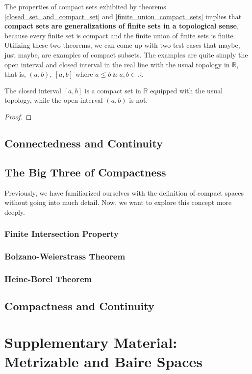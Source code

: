\noindent The properties of compact sets exhibited by theorems \eqref{closed_set_and_compact_set} and \eqref{finite_union_compact_sets} implies that \textbf{compact sets are generalizations of finite sets in a topological sense}, because every finite set is compact\footnotemark {} and the finite union of finite sets is finite.\\ Utilizing these two theorems, we can come up with two test cases that maybe, just maybe, are examples of compact subsets. The examples are quite simply the open interval and closed interval in the real line with the usual topology in $\mathbb{R}$, that is, $(a,b),\ [a,b]$ where $a\leq b\ \&\ a,b\in\mathbb{R}$.
\begin{Example}
    The closed interval $[a,b]$ is a compact set in $\mathbb{R}$ equipped with the usual topology, while the open interval $(a,b)$ is not.
\end{Example}
\begin{proof}
    
\end{proof}
\subsection{Connectedness and Continuity}
\subsection{The Big Three of Compactness}
Previously, we have familiarized ourselves with the definition of compact spaces without going into much detail. Now, we want to explore this concept more deeply.
\subsubsection{Finite Intersection Property}
\subsubsection{Bolzano-Weierstrass Theorem}
\subsubsection{Heine-Borel Theorem}
\subsection{Compactness and Continuity}
\section{Supplementary Material: Metrizable and Baire Spaces}
